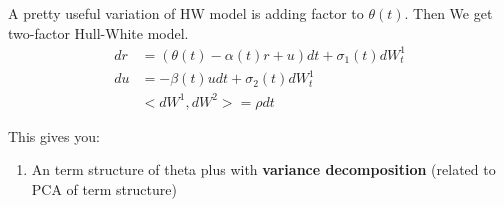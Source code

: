 A pretty useful variation of HW model is adding factor to $\theta(t)$. Then We get two-factor Hull-White model.
\begin{equation}
\begin{aligned}
dr &= (\theta(t) - \alpha(t)r + u) dt + \sigma_1(t) dW^1_t \\
du &= -\beta(t) u dt + \sigma_2(t) dW^1_t \\
& <dW^1, dW^2> = \rho dt
\end{aligned}
\end{equation}

This gives you:
\begin{enumerate}
\item An term structure of theta plus with {\color{red} \textbf{variance decomposition}} (related to PCA of term structure)
\end{enumerate}
